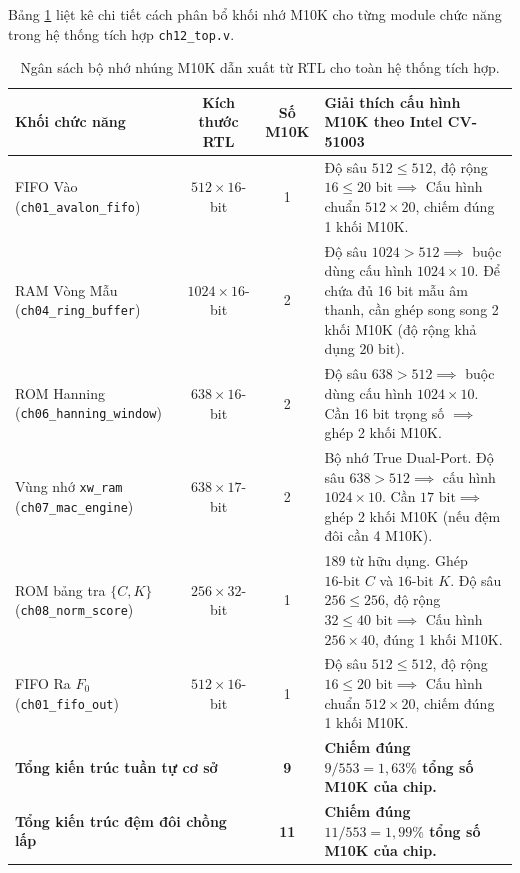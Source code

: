 Bảng \ref{tab:ch12_m10k_budget} liệt kê chi tiết cách phân bổ khối nhớ M10K cho từng module chức năng trong hệ thống tích hợp \texttt{ch12\_top.v}.

\begin{table}[htbp]
\centering
\small
\caption{Ngân sách bộ nhớ nhúng M10K dẫn xuất từ RTL cho toàn hệ thống tích hợp.}
\label{tab:ch12_m10k_budget}
\begin{tabularx}{\linewidth}{|l|c|c|X|}
\hline
\textbf{Khối chức năng} & \textbf{Kích thước RTL} & \textbf{Số M10K} & \textbf{Giải thích cấu hình M10K theo Intel CV-51003} \\
\hline
FIFO Vào (\texttt{ch01\_avalon\_fifo}) & $512 \times 16$-bit & 1 & Độ sâu $512 \le 512$, độ rộng $16 \le 20\text{ bit} \implies$ Cấu hình chuẩn $512 \times 20$, chiếm đúng 1 khối M10K. \\
\hline
RAM Vòng Mẫu (\texttt{ch04\_ring\_buffer}) & $1024 \times 16$-bit & 2 & Độ sâu $1024 > 512 \implies$ buộc dùng cấu hình $1024 \times 10$. Để chứa đủ 16 bit mẫu âm thanh, cần ghép song song 2 khối M10K (độ rộng khả dụng $20\text{ bit}$). \\
\hline
ROM Hanning (\texttt{ch06\_hanning\_window}) & $638 \times 16$-bit & 2 & Độ sâu $638 > 512 \implies$ buộc dùng cấu hình $1024 \times 10$. Cần 16 bit trọng số $\implies$ ghép 2 khối M10K. \\
\hline
Vùng nhớ \texttt{xw\_ram} (\texttt{ch07\_mac\_engine}) & $638 \times 17$-bit & 2 & Bộ nhớ True Dual-Port. Độ sâu $638 > 512 \implies$ cấu hình $1024 \times 10$. Cần $17\text{ bit} \implies$ ghép 2 khối M10K (nếu đệm đôi cần 4 M10K). \\
\hline
ROM bảng tra $\{C, K\}$ (\texttt{ch08\_norm\_score}) & $256 \times 32$-bit & 1 & 189 từ hữu dụng. Ghép $16\text{-bit } C$ và $16\text{-bit } K$. Độ sâu $256 \le 256$, độ rộng $32 \le 40\text{ bit} \implies$ Cấu hình $256 \times 40$, đúng 1 khối M10K. \\
\hline
FIFO Ra $F_0$ (\texttt{ch01\_fifo\_out}) & $512 \times 16$-bit & 1 & Độ sâu $512 \le 512$, độ rộng $16 \le 20\text{ bit} \implies$ Cấu hình chuẩn $512 \times 20$, chiếm đúng 1 khối M10K. \\
\hline
\multicolumn{2}{|l|}{\textbf{Tổng kiến trúc tuần tự cơ sở}} & \textbf{9} & \textbf{Chiếm đúng $9 / 553 = 1{,}63\%$ tổng số M10K của chip.} \\
\hline
\multicolumn{2}{|l|}{\textbf{Tổng kiến trúc đệm đôi chồng lấp}} & \textbf{11} & \textbf{Chiếm đúng $11 / 553 = 1{,}99\%$ tổng số M10K của chip.} \\
\hline
\end{tabularx}
\end{table}

